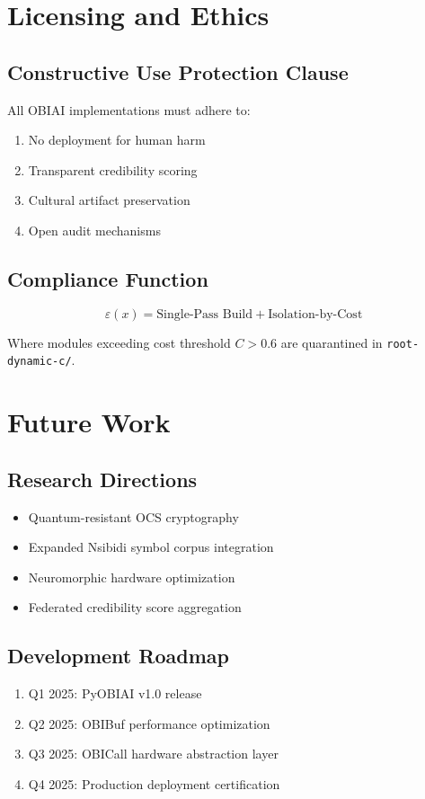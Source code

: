 \documentclass[12pt,a4paper]{article}
\begin{document}
\section{Licensing and Ethics}

\subsection{Constructive Use Protection Clause}
All OBIAI implementations must adhere to:
\begin{enumerate}
    \item No deployment for human harm
    \item Transparent credibility scoring
    \item Cultural artifact preservation
    \item Open audit mechanisms
\end{enumerate}

\subsection{Compliance Function}
\begin{equation}
\varepsilon(x) = \text{Single-Pass Build} + \text{Isolation-by-Cost}
\end{equation}

Where modules exceeding cost threshold $C > 0.6$ are quarantined in \texttt{root-dynamic-c/}.

\section{Future Work}

\subsection{Research Directions}
\begin{itemize}
    \item Quantum-resistant OCS cryptography
    \item Expanded Nsibidi symbol corpus integration
    \item Neuromorphic hardware optimization
    \item Federated credibility score aggregation
\end{itemize}

\subsection{Development Roadmap}
\begin{enumerate}
    \item Q1 2025: PyOBIAI v1.0 release
    \item Q2 2025: OBIBuf performance optimization
    \item Q3 2025: OBICall hardware abstraction layer
    \item Q4 2025: Production deployment certification
\end{enumerate}
\end{document}

